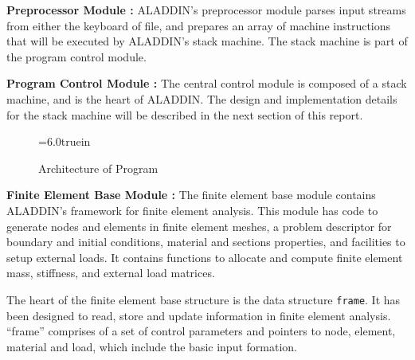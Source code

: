 \vspace{0.15 in}\noindent
{\bf Preprocessor Module :}
ALADDIN's preprocessor module parses input streams
from either the keyboard of file, and prepares an array of machine instructions
that will be executed by ALADDIN's stack machine.
The stack machine is part of the program control module.

\vspace{0.15 in}\noindent
{\bf Program Control Module :}
The central control module is composed of a stack machine,
and is the heart of ALADDIN. The design and implementation
details for the stack machine will be described in
the next section of this report.

\begin{figure}[t]
\epsfxsize=6.0truein
\centerline{} 
\caption{Architecture of Program}
\label{fig:architecture}
\end{figure}

\vspace{0.15 in}\noindent
{\bf Finite Element Base Module :}
The finite element base module contains ALADDIN's framework for finite element analysis.
This module has code to generate nodes and elements in finite element meshes,
a problem descriptor for boundary and initial conditions,
material and sections properties,
and facilities to setup external loads.
It contains functions to allocate and compute finite element
mass, stiffness, and external load matrices.

\vspace{0.15 in}
\noindent\hspace{0.5 in}
The heart of the finite element base structure is the data structure {\tt frame}.
It has been designed to read, store and update information in finite element analysis.
``frame'' comprises of a set of control parameters and pointers to node,
element, material and load, which include the basic input formation. 


